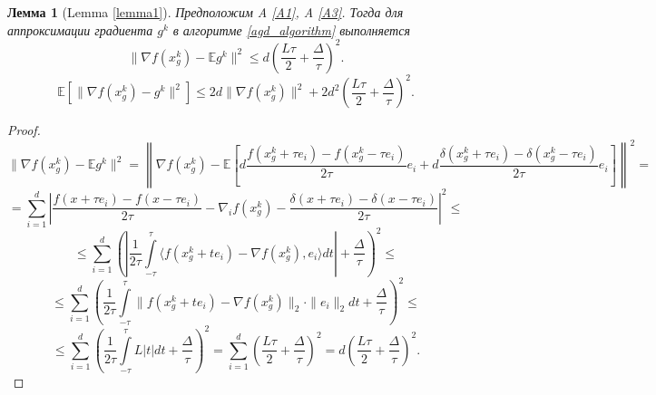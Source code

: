 \documentclass{article}
\newtheorem{lemma}{Лемма}
\begin{document}
\newpage
\appendix\label{appendix}
\begin{lemma}[Lemma \ref{lemma1}]\label{lemma1_appendix}
 Предположим A \ref{A1}, A \ref{A3}. Тогда для аппроксимации градиента $g^k$ в алгоритме \ref{agd_algorithm} выполняется
 \begin{equation}
  \|\nabla f(x_g^k) - \mathbb{E}g^k\|^2 \leqslant d \left(\frac{L\tau}{2} + \frac{\Delta}{\tau}\right)^2.
  \label{norm_of_expectation_appendix}
 \end{equation}
 \begin{equation}
  \mathbb{E}[\|\nabla f(x_g^k) - g^k\|^2] \leqslant 2d \|\nabla f(x_g^k)\|^2 + 2 d^2 \left(\frac{L\tau}{2} + \frac{\Delta}{\tau}\right)^2.
  \label{expectation_of_norm_appendix}
 \end{equation}
\end{lemma}
\begin{proof}
  $$\|\nabla f(x_g^k) - \mathbb{E} g^k\|^2 = \left\lVert \nabla f(x_g^k) - \mathbb{E}\left[d\frac{f(x_g^k + \tau e_i) - f(x_g^k - \tau e_i)}{2\tau} e_i + d\frac{\delta(x_g^k + \tau e_i) - \delta(x_g^k - \tau e_i)}{2\tau} e_i\right]\right\rVert^2 = $$
  $$=\sum\limits_{i = 1}^d \left|\frac{f(x + \tau e_i) - f(x - \tau e_i)}{2\tau} - \nabla_i f(x_g^k) - \frac{\delta(x + \tau e_i) - \delta(x - \tau e_i)}{2\tau}\right|^2 \leqslant$$
  $$\leqslant \sum\limits_{i = 1}^d\left( \left|\frac{1}{2\tau} \int\limits_{-\tau}^\tau \langle f(x_g^k + t e_i) - \nabla f(x_g^k), e_i \rangle dt\right| + \frac{\Delta}{\tau}\right)^2 \leqslant$$
  $$\leqslant \sum\limits_{i = 1}^d\left( \frac{1}{2\tau} \int\limits_{-\tau}^\tau \|f(x_g^k + t e_i) - \nabla f(x_g^k)\|_2 \cdot \|e_i\|_2 dt + \frac{\Delta}{\tau}\right)^2 \leqslant$$
  $$\leqslant \sum\limits_{i = 1}^d\left( \frac{1}{2\tau} \int\limits_{-\tau}^\tau L |t| dt + \frac{\Delta}{\tau}\right)^2 = \sum\limits_{i = 1}^d\left( \frac{L\tau}{2} + \frac{\Delta}{\tau} \right)^2 = d \left(\frac{L\tau}{2} + \frac{\Delta}{\tau}\right)^2.$$


\end{proof}
\end{document}
